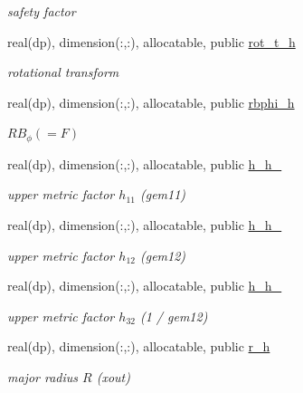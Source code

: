 \begin{DoxyCompactItemize}
\begin{DoxyCompactList}\small\item\em safety factor \end{DoxyCompactList}\item 
real(dp), dimension(\+:,\+:), allocatable, public \hyperlink{namespacehelena__vars_ae54b26f364e5cc4da39bbb01807e0da1}{rot\+\_\+t\+\_\+h}
\begin{DoxyCompactList}\small\item\em rotational transform \end{DoxyCompactList}\item 
real(dp), dimension(\+:,\+:), allocatable, public \hyperlink{namespacehelena__vars_a1983723af0d1de605be96d47ae31d5fc}{rbphi\+\_\+h}
\begin{DoxyCompactList}\small\item\em $R B_\phi (= F) $ \end{DoxyCompactList}\item 
real(dp), dimension(\+:,\+:), allocatable, public \hyperlink{namespacehelena__vars_acb51f1141d5faeeef88bbf7fc6bab55f}{h\+\_\+h\+\_}
\begin{DoxyCompactList}\small\item\em upper metric factor $h_{11}$ ({\ttfamily gem11}) \end{DoxyCompactList}\item 
real(dp), dimension(\+:,\+:), allocatable, public \hyperlink{namespacehelena__vars_ab3fee13ba0983e009a160324044cb708}{h\+\_\+h\+\_}
\begin{DoxyCompactList}\small\item\em upper metric factor $h_{12}$ ({\ttfamily gem12}) \end{DoxyCompactList}\item 
real(dp), dimension(\+:,\+:), allocatable, public \hyperlink{namespacehelena__vars_a1456485c35bfb60ed2d7f93d611a7b5d}{h\+\_\+h\+\_}
\begin{DoxyCompactList}\small\item\em upper metric factor $h_{32}$ (1 / {\ttfamily gem12}) \end{DoxyCompactList}\item 
real(dp), dimension(\+:,\+:), allocatable, public \hyperlink{namespacehelena__vars_a0d157eace0479c9b8cbd4de9495f9775}{r\+\_\+h}
\begin{DoxyCompactList}\small\item\em major radius $R$ (xout) \end{DoxyCompactList}\item 

\end{DoxyCompactItemize}

